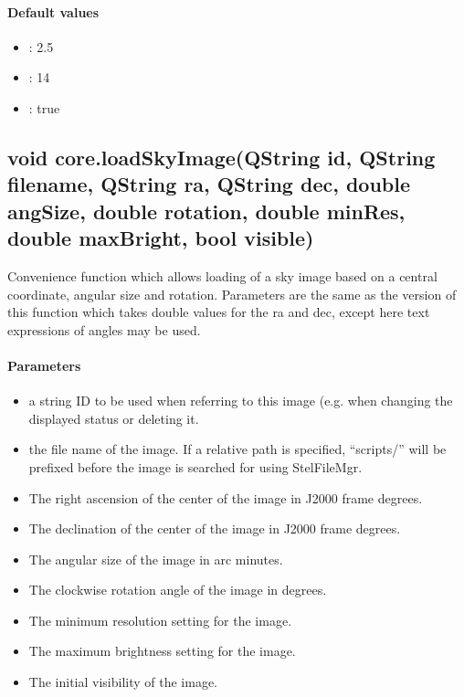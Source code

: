 \paragraph{Default values}
\begin{itemize}
\item {}: 2.5
\item {}: 14
\item {}: true
\end{itemize}

\subsection{void core.loadSkyImage(QString id, QString filename, QString ra, QString dec, double angSize, double rotation, double minRes, double maxBright, bool visible)}
\label{sec:ScriptingAPI:core:loadSkyImageStr1}
Convenience function which allows loading of a sky image based on a central coordinate, angular size and rotation. Parameters are the same as the version of this function which takes double values for the ra and dec, except here text expressions of angles may be used.

\paragraph{Parameters}
\begin{itemize}
\item {} a string ID to be used when referring to this image (e.g. when changing the displayed status or deleting it.
\item {} the file name of the image. If a relative path is specified, ``scripts/'' will be prefixed before the image is searched for using StelFileMgr.
\item {} The right ascension of the center of the image in J2000 frame degrees.
\item {} The declination of the center of the image in J2000 frame degrees.
\item {} The angular size of the image in arc minutes.
\item {} 	The clockwise rotation angle of the image in degrees.
\item {} The minimum resolution setting for the image.
\item {} The maximum brightness setting for the image.
\item {} The initial visibility of the image.
\end{itemize}

